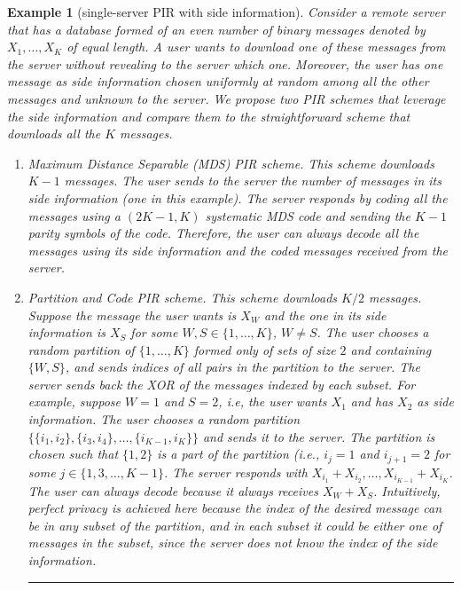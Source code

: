 \documentclass[letterpaper, 10 pt, conference]{ieeeconf}
\newcommand\alexn[1]{\notee[alex]{#1}}
\newtheorem{example}{Example}
\begin{document}
\begin{example}[single-server  PIR with side information]\label{ex:intro}
Consider a remote server that has a database formed of  an even number of binary messages  denoted by $X_1,\dots,X_K$ of equal length.  A user wants to download one of these messages from the server without revealing to the server which one. Moreover, the user has one  message as side information chosen uniformly at random among all the other messages and unknown to the server. We propose two PIR schemes that leverage the side information  and compare them to the straightforward scheme that downloads all the $K$ messages.
\begin{enumerate}

\item{\em Maximum Distance Separable (MDS) PIR scheme.} This scheme downloads $K-1$ messages. The user sends to the server the number of messages in its side information  (one in this example). The server responds by coding all the messages using a $(2K-1,K)$ systematic MDS code and 
sending  the $K-1$ parity symbols of the code. Therefore, the user can always decode all the messages using its side information and the coded messages received from the server.

\item{\em Partition and Code PIR scheme.} This scheme downloads $K/2$ messages. Suppose the message the user wants is $X_W$ and the one in its side information is $X_S$ for some $W,S \in\{1,\dots,K\}$, $W\neq S$. The user chooses  a random partition of $\{1,\dots,K\}$ formed only of sets of size $2$ and containing $\{W,S\}$, and sends indices of all pairs in the partition to the server. The server sends back the XOR of the messages indexed by each subset. For example, suppose  $W=1$ and  $S=2$, i.e, the user wants $X_1$ and has $X_2$ as side information.  The user chooses a random partition $\{\{i_1,i_2\},\{i_3,i_4\},\dots,\{i_{K-1},i_K\}\}$ and sends it to the server. The partition is chosen such that $\{1,2\}$ is a part of the partition (i.e., $i_j=1$ and $i_{j+1}=2$ for some $j\in\{1,3,\dots,K-1\}$. 
The server responds with $X_{i_1}+X_{i_2},\dots, X_{i_{K-1}}+X_{i_K}$. The user can always decode because it always receives $X_W+X_S$. Intuitively, perfect privacy is achieved here because the index of the desired message can be in any subset of the partition, and in each subset it could be either one of messages in the subset, since the server does not know the index of the side information. \hfill\rule{1.3ex}{1.3ex}
 \end{enumerate}
 \end{example}
\end{document}
